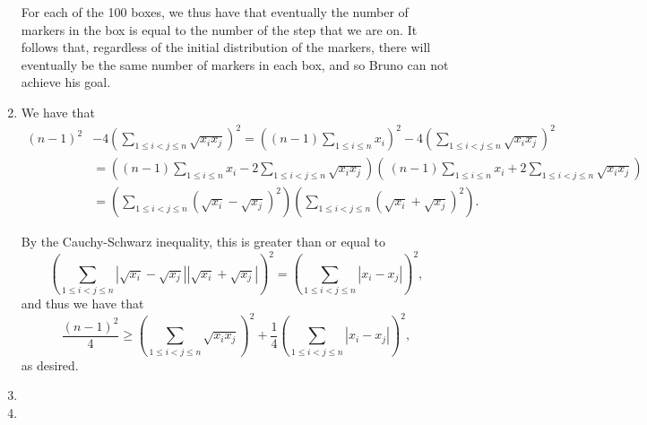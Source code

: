 \documentclass[12pt]{article}
\begin{document}
\begin{enumerate}
For each of the 100 boxes, we thus have that eventually the number of markers
in the box is equal to the number of the step that we are on. It follows that,
regardless of the initial distribution of the markers, there will
eventually be the same number of markers in each box, and so Bruno can not
achieve his goal.

\item %
We have that
\begin{align*}
    (n - 1)^2 & - 4 \left(\sum_{1 \leq i < j \leq n} \sqrt{x_i x_j} \right)^2 
     = \left( (n - 1) \sum_{1 \leq i \leq n} x_i \right)^2 - 4 \left(\sum_{1
    \leq i < j \leq n} \sqrt{x_i x_j} \right)^2 \\
    & = \left( (n - 1) \sum_{1 \leq i \leq n} x_i - 2 \sum_{1 \leq i < j \leq n}
    \sqrt{x_i x_j} \right) \left( \ (n - 1) \sum_{1 \leq i \leq n} x_i + 2
    \sum_{1 \leq i < j \leq n} \sqrt{x_i x_j} \right) \\
    & = \left( \sum_{1 \leq i < j \leq n} (\sqrt{x_i} - \sqrt{x_j})^2 \right)
        \left( \sum_{1 \leq i < j \leq n} (\sqrt{x_i} + \sqrt{x_j})^2 \right).
\end{align*}

By the Cauchy-Schwarz inequality, this is greater than or equal to
\[
    \left( \sum_{1 \leq i < j \leq n} | \sqrt{x_i} - \sqrt{x_j} | | \sqrt{x_i} +
    \sqrt{x_j} | \right)^2 = \left( \sum_{1 \leq i < j \leq n} | x_i - x_j |
    \right)^2,
\]
and thus we have that
\[
    \frac{(n - 1)^2}{4} \geq \left( \sum_{1 \leq i < j \leq n} \sqrt{x_i x_j}
    \right)^2 + \frac{1}{4} \left( \sum_{1 \leq i < j \leq n} |x_i - x_j|
    \right)^2,
\]
as desired.

\item %


\item %
%


\end{enumerate}
\end{document}
